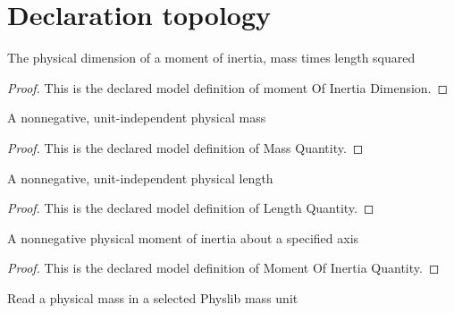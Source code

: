 \section{Declaration topology}
\begin{definition}
  \label{def:physics:phyx-mini-0538:phyxminiproblems-problemphyxmini0538-momentofinertiadimension}
  The physical dimension of a moment of inertia, mass times length squared
\end{definition}
\begin{proof}
  This is the declared model definition of moment Of Inertia Dimension.
\end{proof}
\begin{definition}
  \label{def:physics:phyx-mini-0538:phyxminiproblems-problemphyxmini0538-massquantity}
  A nonnegative, unit-independent physical mass
\end{definition}
\begin{proof}
  This is the declared model definition of Mass Quantity.
\end{proof}
\begin{definition}
  \label{def:physics:phyx-mini-0538:phyxminiproblems-problemphyxmini0538-lengthquantity}
  A nonnegative, unit-independent physical length
\end{definition}
\begin{proof}
  This is the declared model definition of Length Quantity.
\end{proof}
\begin{definition}
  \label{def:physics:phyx-mini-0538:phyxminiproblems-problemphyxmini0538-momentofinertiaquantity}
  A nonnegative physical moment of inertia about a specified axis
\end{definition}
\begin{proof}
  This is the declared model definition of Moment Of Inertia Quantity.
\end{proof}
\begin{definition}
  \label{def:physics:phyx-mini-0538:phyxminiproblems-problemphyxmini0538-massreadout}
  Read a physical mass in a selected Physlib mass unit
\end{definition}
